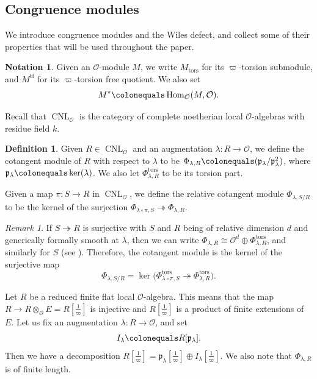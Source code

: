 \documentclass[a4paper, notitlepage, 10pt]{amsart}
\theoremstyle{plain} %
\theoremstyle{definition} %
\newtheorem{definition}[theorem]{Definition}
\newtheorem{notation}[theorem]{Notation}
\theoremstyle{remark} %
\newtheorem{remark}[theorem]{Remark}
\numberwithin{equation}{section}
\newcommand{\CNL}{\operatorname{CNL}}
\newcommand{\Hom}{\operatorname{Hom}} %
\newcommand{\tf}{\operatorname{tf}} %
\newcommand{\tors}{\operatorname{tors}} %
\begin{document}
\subsection{Congruence modules} We introduce congruence modules and the Wiles defect, and collect some of their properties that will be used throughout the paper.

\begin{notation}
Given an $\mathcal{O}$-module $M$, we write $M_{\tors}$ for its $\varpi$-torsion submodule, and $M^{\tf}$ for its $\varpi$-torsion free quotient.  We also set 
$$ M^*\colonequals \Hom_{\mathcal{O}}(M,\mathcal{O}). $$
\end{notation}
Recall that $\CNL_\mathcal{O}$ is the category of complete noetherian local $\mathcal{O}$-algebras with residue field $k$.
\begin{definition}
    Given $R\in \CNL_{\mathcal{O}}$ and an augmentation $\lambda\colon R\to \mathcal{O}$, we define the cotangent module of $R$ with respect to $\lambda$ to be $\Phi_{\lambda,R}\colonequals(\mathfrak{p}_\lambda/\mathfrak{p}_{\lambda}^2)$, where $\mathfrak{p}_\lambda \colonequals \ker(\lambda)$. We also let $\Phi_{\lambda,R}^{\tors}$ to be its torsion part.
    
     Given a map $\pi\colon S\to R$ in $\CNL_{\mathcal{O}}$, we define the relative cotangent module $\Phi_{\lambda,S/R}$ to be the kernel of the surjection $\Phi_{\lambda\circ \pi,S}\twoheadrightarrow \Phi_{\lambda,R}$. 
\end{definition}
\begin{remark}\label{torsioncotangentspace}
    If $S\twoheadrightarrow R$ is surjective with $S$ and $R$ being of relative dimension $d$ and generically formally smooth at $\lambda$, then we can write $\Phi_{\lambda,R}\cong \mathcal{O}^d\oplus \Phi_{\lambda,R}^{\tors} $, and similarly for $S$ (see \cite[Lemma 2.7]{BIK}). Therefore, the cotangent module is the kernel of the surjective map
    $$ \Phi_{\lambda,S/R}=\ker\big( \Phi_{\lambda\circ \pi,S}^{\tors}\twoheadrightarrow \Phi_{\lambda,R}^{\tors}\big).$$
\end{remark}
Let $R$ be a reduced finite flat local $\mathcal{O}$-algebra. This means that the map $R\to R\otimes_{\mathcal{O}}E=R[\tfrac{1}{\varpi}]$ is injective and $R[\tfrac{1}{\varpi}]$ is a product of finite extensions of $E$. Let us fix an augmentation $\lambda\colon R \to \mathcal{O}$, and set
$$I_\lambda\colonequals R[\mathfrak{p}_\lambda].$$
Then we have a decomposition $R[\tfrac{1}{\varpi}]=\mathfrak{p}_\lambda[\tfrac{1}{\varpi}]\oplus I_\lambda[\tfrac{1}{\varpi}]$. We also note that $\Phi_{\lambda,R}$ is of finite length.
\end{document}

